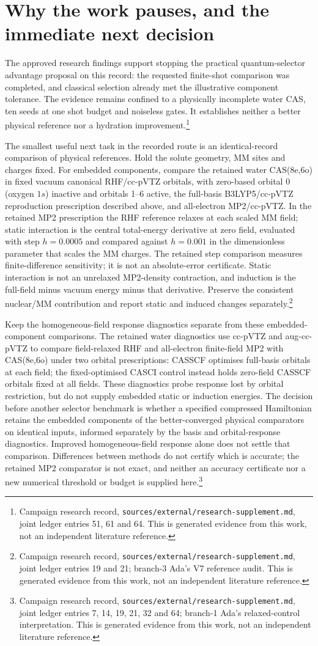 \documentclass{article}
\newcommand{\record}[1]{\footnote{Campaign research record, \texttt{sources/external/research-supplement.md}, #1. This is generated evidence from this work, not an independent literature reference.}}
\begin{document}
\section{Why the work pauses, and the immediate next decision}
The approved research findings support stopping the practical quantum-selector advantage proposal on this record: the requested finite-shot comparison was completed, and classical selection already met the illustrative component tolerance. The evidence remains confined to a physically incomplete water CAS, ten seeds at one shot budget and noiseless gates. It establishes neither a better physical reference nor a hydration improvement.\record{joint ledger entries 51, 61 and 64}

The smallest useful next task in the recorded route is an identical-record comparison of physical references. Hold the solute geometry, MM sites and charges fixed. For embedded components, compare the retained water CAS(8e,6o) in fixed vacuum canonical RHF/cc-pVTZ orbitals, with zero-based orbital 0 (oxygen \(1s\)) inactive and orbitals 1--6 active, the full-basis B3LYP5/cc-pVTZ reproduction prescription described above, and all-electron MP2/cc-pVTZ. In the retained MP2 prescription the RHF reference relaxes at each scaled MM field; static interaction is the central total-energy derivative at zero field, evaluated with step \(h=0.0005\) and compared against \(h=0.001\) in the dimensionless parameter that scales the MM charges. The retained step comparison measures finite-difference sensitivity; it is not an absolute-error certificate. Static interaction is not an unrelaxed MP2-density contraction, and induction is the full-field minus vacuum energy minus that derivative. Preserve the consistent nuclear/MM contribution and report static and induced changes separately.\record{joint ledger entries 19 and 21; branch-3 Ada's V7 reference audit}

Keep the homogeneous-field response diagnostics separate from these embedded-component comparisons. The retained water diagnostics use cc-pVTZ and aug-cc-pVTZ to compare field-relaxed RHF and all-electron finite-field MP2 with CAS(8e,6o) under two orbital prescriptions: CASSCF optimises full-basis orbitals at each field; the fixed-optimised CASCI control instead holds zero-field CASSCF orbitals fixed at all fields. These diagnostics probe response lost by orbital restriction, but do not supply embedded static or induction energies. The decision before another selector benchmark is whether a specified compressed Hamiltonian retains the embedded components of the better-converged physical comparators on identical inputs, informed separately by the basis and orbital-response diagnostics. Improved homogeneous-field response alone does not settle that comparison. Differences between methods do not certify which is accurate; the retained MP2 comparator is not exact, and neither an accuracy certificate nor a new numerical threshold or budget is supplied here.\record{joint ledger entries 7, 14, 19, 21, 32 and 64; branch-1 Ada's relaxed-control interpretation}
\end{document}
